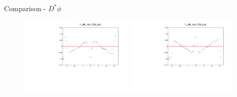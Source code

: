 \documentclass[11pt]{beamer}
\begin{document}
\begin{frame}{Comparison - $D^* \phi$}\begin{figure}
\centering
{}
\includegraphics[width=0.48\textwidth]{up_pdf/deviation/h_phi_reco_Dst_pos_dev.pdf}
\includegraphics[width=0.48\textwidth]{down_pdf/deviation/h_phi_reco_Dst_pos_dev.pdf}

\end{figure}
\end{frame}
\end{document}
